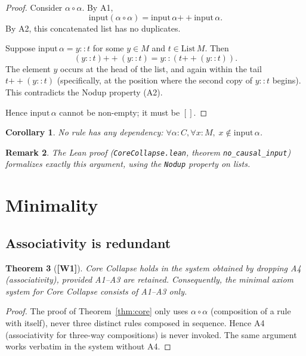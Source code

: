 ﻿\documentclass[11pt]{article}
\newcommand{\wone}[1]{\textcolor{wcolor}{\textbf{[#1]}}}
\newtheorem{theorem}{Theorem}
\newtheorem{corollary}[theorem]{Corollary}
\newtheorem{remark}[theorem]{Remark}
\begin{document}
\begin{proof}
Consider $\alpha \circ \alpha$. By A1,
\[
\mathrm{input}(\alpha \circ \alpha)
  = \mathrm{input}\,\alpha \mathbin{+\!+}
    \mathrm{input}\,\alpha.
\]
By A2, this concatenated list has no duplicates.

Suppose $\mathrm{input}\,\alpha = y :: t$ for some $y \in M$
and $t \in \mathrm{List}\,M$. Then
\[
(y :: t) \mathbin{+\!+} (y :: t)
  = y :: (t \mathbin{+\!+} (y :: t)).
\]
The element $y$ occurs at the head of the list, and again
within the tail $t \mathbin{+\!+} (y :: t)$ (specifically,
at the position where the second copy of $y :: t$ begins).
This contradicts the Nodup property (A2).

Hence $\mathrm{input}\,\alpha$ cannot be non-empty; it must
be $[]$.
\end{proof}

\begin{corollary}
\label{cor:no-dependency}
No rule has any dependency:
$\forall \alpha : C, \forall x : M,\; x \notin \mathrm{input}\,\alpha$.
\end{corollary}

\begin{remark}
The Lean proof (\texttt{CoreCollapse.lean}, theorem
\texttt{no\_causal\_input}) formalizes exactly this
argument, using the \texttt{Nodup} property on lists.
\end{remark}

\section{Minimality}
\label{sec:minimal}

\subsection{Associativity is redundant}

\begin{theorem}[\wone{W1}]
\label{thm:assoc-redundant}
Core Collapse holds in the system obtained by dropping A4
(associativity), provided A1--A3 are retained. Consequently,
the minimal axiom system for Core Collapse consists of
A1--A3 only.
\end{theorem}

\begin{proof}
The proof of Theorem~\ref{thm:core} only uses
$\alpha \circ \alpha$ (composition of a rule with itself),
never three distinct rules composed in sequence. Hence
A4 (associativity for three-way compositions) is never
invoked. The same argument works verbatim in the system
without A4.
\end{proof}
\end{document}
